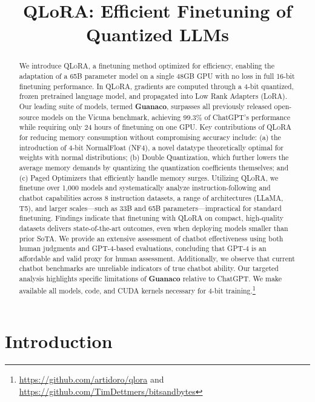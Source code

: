 \title{QLoRA: Efficient Finetuning of Quantized LLMs}

\begin{abstract}
We introduce \textsc{QLoRA}, a finetuning method optimized for efficiency, enabling the adaptation of a 65B parameter model on a single 48GB GPU with no loss in full 16-bit finetuning performance. In \textsc{QLoRA}, gradients are computed through a 4-bit quantized, frozen pretrained language model, and propagated into Low Rank Adapters (LoRA). Our leading suite of models, termed \textbf{Guanaco}, surpasses all previously released open-source models on the Vicuna benchmark, achieving 99.3\% of ChatGPT’s performance while requiring only 24 hours of finetuning on one GPU. Key contributions of \textsc{QLoRA} for reducing memory consumption without compromising accuracy include: (a) the introduction of 4-bit NormalFloat (NF4), a novel datatype theoretically optimal for weights with normal distributions; (b) Double Quantization, which further lowers the average memory demands by quantizing the quantization coefficients themselves; and (c) Paged Optimizers that efficiently handle memory surges. Utilizing \textsc{QLoRA}, we finetune over 1,000 models and systematically analyze instruction-following and chatbot capabilities across 8 instruction datasets, a range of architectures (LLaMA, T5), and larger scales—such as 33B and 65B parameters—impractical for standard finetuning. Findings indicate that finetuning with QLoRA on compact, high-quality datasets delivers state-of-the-art outcomes, even when deploying models smaller than prior SoTA. We provide an extensive assessment of chatbot effectiveness using both human judgments and GPT-4-based evaluations, concluding that GPT-4 is an affordable and valid proxy for human assessment. Additionally, we observe that current chatbot benchmarks are unreliable indicators of true chatbot ability. Our targeted analysis highlights specific limitations of \textbf{Guanaco} relative to ChatGPT. We make available all models, code, and CUDA kernels necessary for 4-bit training.\footnote{\url{https://github.com/artidoro/qlora} and \url{https://github.com/TimDettmers/bitsandbytes}}
\end{abstract}

\section{Introduction}

